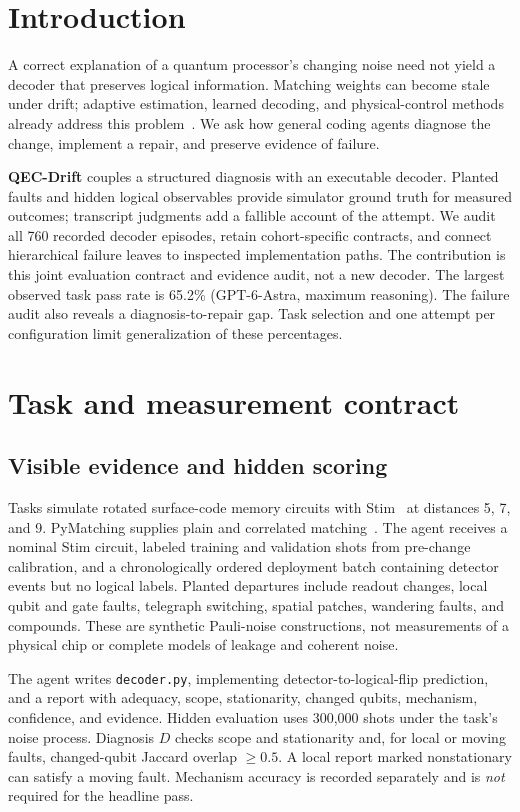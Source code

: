 \documentclass{article}
\newcommand{\code}[1]{\texttt{#1}}
\begin{document}
\section{Introduction}
A correct explanation of a quantum processor's changing noise need not yield a decoder that preserves logical information. Matching weights can become stale under drift; adaptive estimation, learned decoding, and physical-control methods already address this problem~\citep{spitz,dgr,alpha,alpha2,rl}. We ask how general coding agents diagnose the change, implement a repair, and preserve evidence of failure.

\textbf{QEC-Drift} couples a structured diagnosis with an executable decoder. Planted faults and hidden logical observables provide simulator ground truth for measured outcomes; transcript judgments add a fallible account of the attempt. We audit all 760 recorded decoder episodes, retain cohort-specific contracts, and connect hierarchical failure leaves to inspected implementation paths. The contribution is this joint evaluation contract and evidence audit, not a new decoder. The largest observed task pass rate is 65.2\% (GPT-6-Astra, maximum reasoning). The failure audit also reveals a diagnosis-to-repair gap. Task selection and one attempt per configuration limit generalization of these percentages.

\section{Task and measurement contract}
\subsection{Visible evidence and hidden scoring}
Tasks simulate rotated surface-code memory circuits with Stim~\citep{stim} at distances 5, 7, and 9. PyMatching supplies plain and correlated matching~\citep{sparse}. The agent receives a nominal Stim circuit, labeled training and validation shots from pre-change calibration, and a chronologically ordered deployment batch containing detector events but no logical labels. Planted departures include readout changes, local qubit and gate faults, telegraph switching, spatial patches, wandering faults, and compounds. These are synthetic Pauli-noise constructions, not measurements of a physical chip or complete models of leakage and coherent noise.

The agent writes \code{decoder.py}, implementing detector-to-logical-flip prediction, and a report with adequacy, scope, stationarity, changed qubits, mechanism, confidence, and evidence. Hidden evaluation uses 300,000 shots under the task's noise process. Diagnosis $D$ checks scope and stationarity and, for local or moving faults, changed-qubit Jaccard overlap $\geq 0.5$. A local report marked nonstationary can satisfy a moving fault. Mechanism accuracy is recorded separately and is \emph{not} required for the headline pass.
\end{document}
